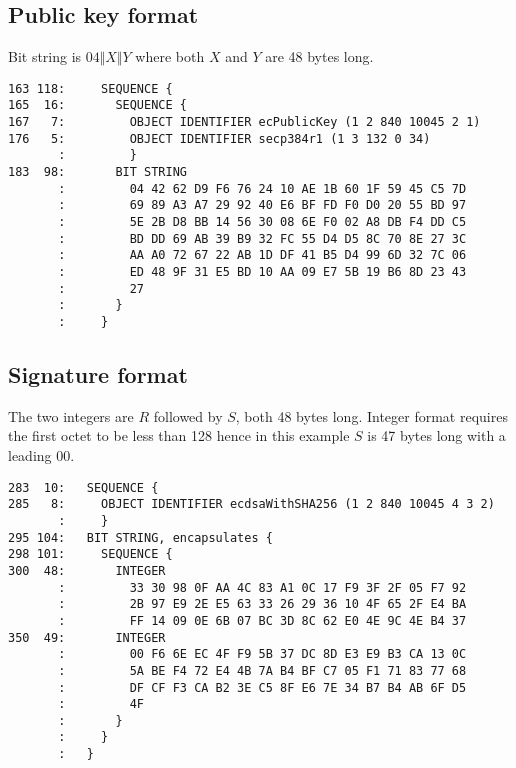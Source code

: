 \documentclass[12pt]{article}
\begin{document}
\subsection{Public key format}

\noindent
Bit string is $04\Vert X\Vert Y$ where both $X$ and $Y$ are 48 bytes long.

\begin{verbatim}
163 118:     SEQUENCE {
165  16:       SEQUENCE {
167   7:         OBJECT IDENTIFIER ecPublicKey (1 2 840 10045 2 1)
176   5:         OBJECT IDENTIFIER secp384r1 (1 3 132 0 34)
       :         }
183  98:       BIT STRING
       :         04 42 62 D9 F6 76 24 10 AE 1B 60 1F 59 45 C5 7D
       :         69 89 A3 A7 29 92 40 E6 BF FD F0 D0 20 55 BD 97
       :         5E 2B D8 BB 14 56 30 08 6E F0 02 A8 DB F4 DD C5
       :         BD DD 69 AB 39 B9 32 FC 55 D4 D5 8C 70 8E 27 3C
       :         AA A0 72 67 22 AB 1D DF 41 B5 D4 99 6D 32 7C 06
       :         ED 48 9F 31 E5 BD 10 AA 09 E7 5B 19 B6 8D 23 43
       :         27
       :       }
       :     }
\end{verbatim}

\subsection{Signature format}

\noindent
The two integers are $R$ followed by $S$, both 48 bytes long.
Integer format requires the first octet to be less than 128
hence in this example $S$ is 47 bytes long with a leading 00.

\begin{verbatim}
283  10:   SEQUENCE {
285   8:     OBJECT IDENTIFIER ecdsaWithSHA256 (1 2 840 10045 4 3 2)
       :     }
295 104:   BIT STRING, encapsulates {
298 101:     SEQUENCE {
300  48:       INTEGER
       :         33 30 98 0F AA 4C 83 A1 0C 17 F9 3F 2F 05 F7 92
       :         2B 97 E9 2E E5 63 33 26 29 36 10 4F 65 2F E4 BA
       :         FF 14 09 0E 6B 07 BC 3D 8C 62 E0 4E 9C 4E B4 37
350  49:       INTEGER
       :         00 F6 6E EC 4F F9 5B 37 DC 8D E3 E9 B3 CA 13 0C
       :         5A BE F4 72 E4 4B 7A B4 BF C7 05 F1 71 83 77 68
       :         DF CF F3 CA B2 3E C5 8F E6 7E 34 B7 B4 AB 6F D5
       :         4F
       :       }
       :     }
       :   }
\end{verbatim}
\end{document}
